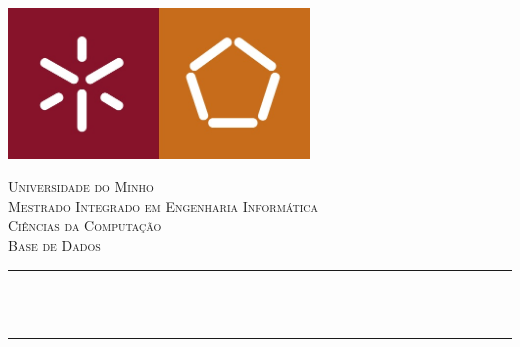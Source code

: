 \begin{titlepage}

\newcommand{\HRule}{\rule{\linewidth}{0.5mm}} %


\includegraphics[width=8cm]{title/logoEEUM.jpg}\\[1cm] %
 

\center %


\textsc{\LARGE Universidade do Minho}\\[1.5cm] %
\textsc{\Large Mestrado Integrado em Engenharia Informática\\Ciências da Computação}\\[0.5cm] %
\textsc{\large Base de Dados}\\[0.5cm] %

\makeatletter
\HRule \\[0.4cm]
{ \huge \bfseries \@title}\\[0.4cm] %
\HRule \\[1.5cm]
 


\end{titlepage}
